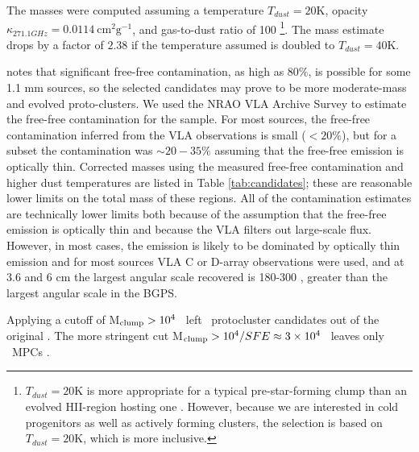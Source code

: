 

The masses were computed assuming a temperature $T_{dust}=20$K, opacity
$\kappa_{271.1 GHz} = 0.0114~\mathrm{cm}^2 \mathrm{g}^{-1}$, and gas-to-dust
ratio of 100  \citep{Aguirre2011} \footnote{$T_{dust}=20$K is more appropriate
for a typical pre-star-forming clump than an evolved HII-region hosting one
\citep[e.g.]{Dunham2010}. However, because we are interested in cold
progenitors as well as actively forming clusters, the selection is based on
$T_{dust}=20$K, which is more inclusive. }.  The mass estimate drops by a
factor of $2.38$ if the temperature assumed is doubled to $T_{dust}=40$K.  

\citet{Ginsburg2011} notes that significant free-free contamination, as high as
80\%, is possible for some 1.1 mm sources, so the selected candidates may prove
to be more moderate-mass and evolved proto-clusters.  We used the NRAO VLA
Archive Survey \citep[NVAS;][]{Crossley2008} to estimate the free-free
contamination for the sample.  For most sources, the free-free contamination
inferred from the VLA observations is small ($<20\%$), but for a subset the
contamination was $\sim20-35\%$ assuming that the free-free emission is
optically thin.  Corrected masses using the measured free-free contamination
and higher dust temperatures are listed in Table \ref{tab:candidates}; these
are reasonable lower limits on the total mass of these regions.  All of the
contamination estimates are technically lower limits both because of the
assumption that the free-free emission is optically thin and because the VLA
filters out large-scale flux.  However, in most cases, the emission is likely
to be dominated by optically thin emission \citep[evolved HII regions tend to
be optically thin and bright, while compact HII regions are optically thick but
relatively faint;][]{Keto2002} and for most sources VLA C or D-array
observations were used, and at 3.6 and 6 cm the largest angular scale recovered
is 180-300 \arcsec, greater than the largest angular scale in the BGPS.  

Applying a cutoff of M$_{\rm clump} > 10^4$ \msun\ left \ncandidates\
protocluster candidates out of the original \nsample.  The more stringent cut
M$_{\rm clump} > 10^4 / SFE \approx 3\times10^{4}$ \msun\ leaves only \nMPC\ MPCs . 

